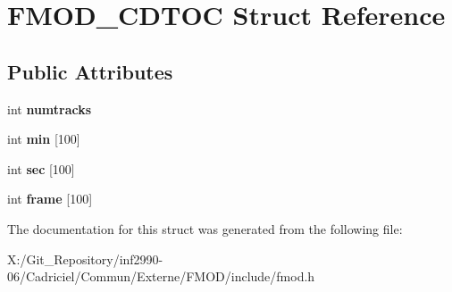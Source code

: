 \hypertarget{struct_f_m_o_d___c_d_t_o_c}{\section{F\-M\-O\-D\-\_\-\-C\-D\-T\-O\-C Struct Reference}
\label{struct_f_m_o_d___c_d_t_o_c}
}
\subsection*{Public Attributes}
\begin{DoxyCompactItemize}
\item 
\hypertarget{struct_f_m_o_d___c_d_t_o_c_aad0a3526919d1d67958c47179a73cf7b}{int {\bfseries numtracks}}\label{struct_f_m_o_d___c_d_t_o_c_aad0a3526919d1d67958c47179a73cf7b}

\item 
\hypertarget{struct_f_m_o_d___c_d_t_o_c_ac32672636e86e7d5da6cd02737123f0e}{int {\bfseries min} \mbox{[}100\mbox{]}}\label{struct_f_m_o_d___c_d_t_o_c_ac32672636e86e7d5da6cd02737123f0e}

\item 
\hypertarget{struct_f_m_o_d___c_d_t_o_c_a20dcf991841f7f4322904f9a1175e7c6}{int {\bfseries sec} \mbox{[}100\mbox{]}}\label{struct_f_m_o_d___c_d_t_o_c_a20dcf991841f7f4322904f9a1175e7c6}

\item 
\hypertarget{struct_f_m_o_d___c_d_t_o_c_a40e8bdc25c765a02c4ca0af13c74dc5f}{int {\bfseries frame} \mbox{[}100\mbox{]}}\label{struct_f_m_o_d___c_d_t_o_c_a40e8bdc25c765a02c4ca0af13c74dc5f}

\end{DoxyCompactItemize}


The documentation for this struct was generated from the following file\-:\begin{DoxyCompactItemize}
\item 
X\-:/\-Git\-\_\-\-Repository/inf2990-\/06/\-Cadriciel/\-Commun/\-Externe/\-F\-M\-O\-D/include/fmod.\-h\end{DoxyCompactItemize}
